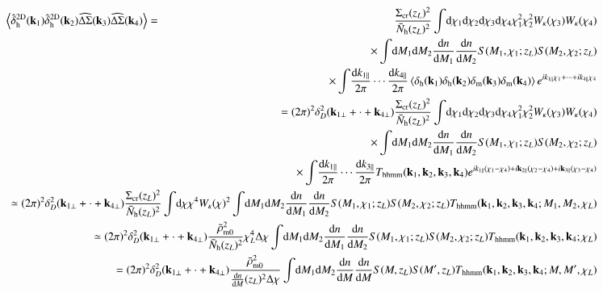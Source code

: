 \documentclass[onecolumn,notitlepage,showpacs,amsmath,amssymb,prd,floatfix]{revtex4-1}
\def\ave#1{\left\langle #1 \right\rangle}
\newcommand{\bk}{{\bf k}}
\newcommand{\dr}{\mathrm{d}}
\newcommand{\deltah}{\delta_{\mathrm{h}}}
\newcommand{\bh}{\mathrm{h}}
\newcommand{\bnh}{\frac{\dr n}{\dr M}}
\newcommand{\sigmacr}{\Sigma_{\rm cr}}
\newcommand{\dsigma}{\Delta\Sigma}
\newcommand{\hdsigma}{\widehat{\dsigma}}
\begin{document}
\begin{eqnarray}
 \ave{\hat{\delta}^{\rm 2D}_\bh(\bk_1)
  \hat{\delta}^{\rm 2D}_\bh(\bk_2)
  \hdsigma(\bk_3)
  \hdsigma(\bk_4)
  }&=&\frac{\sigmacr(z_L)^2}{\bar{N}_\bh(z_L)^2}
  \int\!\dr\chi_1\dr\chi_2
  \dr\chi_3 \dr\chi_4
  \chi_1^2\chi_2^2 W_\kappa(\chi_3)W_\kappa(\chi_4)\nonumber\\
 &&\hspace{-8em}\times
  \int\!\dr M_1\dr M_2 \frac{\dr n}{\dr M_1}\frac{\dr n}{\dr M_2}
  S(M_1,\chi_1;z_L)S(M_2,\chi_2;z_L)\nonumber\\
 &&\hspace{-8em}\times
  \int\!\frac{\dr k_{1\parallel}}{2\pi}
  \cdots\frac{\dr k_{4\parallel}}{2\pi}
  \ave{\deltah(\bk_1)  \deltah(\bk_2)
  \delta_{\rm m}(\bk_3)  \delta_{\rm m}(\bk_4)}
  e^{ik_{1\parallel}\chi_1+\cdots+ik_{4\parallel}\chi_4
  }\nonumber\\
 &&\hspace{-14em}=(2\pi)^2\delta_D^2(\bk_{1\perp}+\cdot+\bk_{4\perp})
\frac{\sigmacr(z_L)^2}{\bar{N}_\bh(z_L)^2}
  \int\!\dr\chi_1\dr\chi_2
  \dr\chi_3 \dr\chi_4
  \chi_1^2\chi_2^2 W_\kappa(\chi_3)W_\kappa(\chi_4)\nonumber\\ 
 &&\hspace{-8em}\times
  \int\!\dr M_1\dr M_2 \frac{\dr n}{\dr M_1}\frac{\dr n}{\dr M_2}
  S(M_1,\chi_1;z_L)S(M_2,\chi_2;z_L)\nonumber\\
&&\hspace{-8em}\times \int\!\frac{\dr k_{1\parallel}}{2\pi}
  \cdots\frac{\dr k_{3\parallel}}{2\pi}
 T_{\rm hhmm}(\bk_1,\bk_2,\bk_3,\bk_4)
  e^{ik_{1\parallel}(\chi_1-\chi_4)+i\bk_{2\parallel}(\chi_2-\chi_4)
  +i\bk_{3\parallel}(\chi_3-\chi_4)
  }\nonumber\\
 &&\hspace{-14em}\simeq (2\pi)^2\delta_D^2(\bk_{1\perp}+\cdot+\bk_{4\perp})
\frac{\sigmacr(z_L)^2}{\bar{N}_\bh(z_L)^2}
  \int\!\dr\chi
  \chi^4 W_\kappa(\chi)^2
  \int\!\dr M_1\dr M_2 \frac{\dr n}{\dr M_1}\frac{\dr n}{\dr M_2}
  S(M_1,\chi_1;z_L)S(M_2,\chi_2;z_L)
 T_{\rm hhmm}(\bk_1,\bk_2,\bk_3,\bk_4;M_1,M_2,\chi_L)
 \nonumber\\
 &&\hspace{-14em}\simeq
  (2\pi)^2\delta_D^2(\bk_{1\perp}+\cdot+\bk_{4\perp})
  \frac{\bar{\rho}_{\rm m0}^2}{\bar{N}_\bh(z_L)^2}
 \chi_L^4 \Delta\chi  \int\!\dr M_1\dr M_2 \frac{\dr n}{\dr M_1}\frac{\dr n}{\dr M_2}
  S(M_1,\chi_1;z_L)S(M_2,\chi_2;z_L)
 T_{\rm hhmm}(\bk_1,\bk_2,\bk_3,\bk_4;\chi_L)\nonumber\\
 &&\hspace{-14em}=
  (2\pi)^2\delta_D^2(\bk_{1\perp}+\cdot+\bk_{4\perp})
  \frac{\bar{\rho}_{\rm m0}^2}{\bnh(z_L)^2\Delta\chi}
\int\!\dr M_1\dr M_2 \frac{\dr n}{\dr M}\frac{\dr n}{\dr M}
  S(M,z_L)S(M',z_L)
 T_{\rm hhmm}(\bk_1,\bk_2,\bk_3,\bk_4;M,M',\chi_L)
\end{eqnarray}
\end{document}
